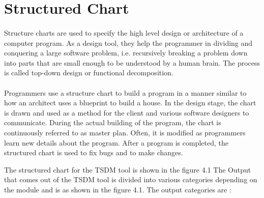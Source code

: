 \documentclass[12pt,a4paper]{report}
\begin{document}
\section{Structured Chart}
\paragraph{}Structure charts are used to specify the high level design or architecture of a computer program. As a design tool, they help the programmer in dividing and conquering a large software problem, i.e. recursively breaking a problem down into parts that are small enough to be understood by a human brain. The process is called top-down design or functional decomposition. 
\paragraph{}Programmers use a structure chart to build a program in a manner similar to how an architect uses a blueprint to build a house. In the design stage, the chart is drawn and used as a method for the client and various software designers to communicate. During the actual building of the program, the chart is continuously referred to as master plan. Often, it is modified as programmers learn new details about the program. After a program is completed, the structured chart is used to fix bugs and to make changes.


The structured chart for the TSDM tool is shown in the figure 4.1 The Output that comes out of the TSDM tool is divided into various categories depending on the module and is as shown in the figure 4.1.
The output categories are :
\end{document}
